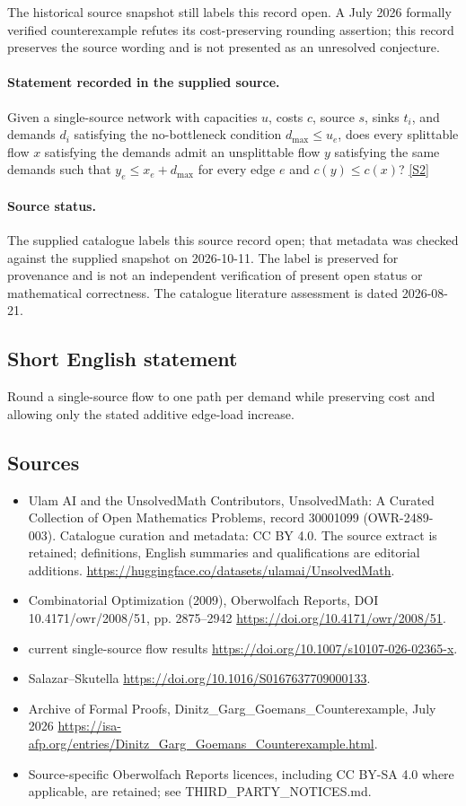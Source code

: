 \documentclass[11pt]{article}
\begin{document}
The historical source snapshot still labels this record open. A July 2026 formally verified counterexample refutes its cost-preserving rounding assertion; this record preserves the source wording and is not presented as an unresolved conjecture.
\paragraph{Statement recorded in the supplied source.}
Given a single-source network with capacities $u$, costs $c$, source $s$, sinks $t_i$, and demands $d_i$ satisfying the no-bottleneck condition $d_{\max}\leq u_e$, does every splittable flow $x$ satisfying the demands admit an unsplittable flow $y$ satisfying the same demands such that $y_e\leq x_e+d_{\max}$ for every edge $e$ and $c(y)\leq c(x)$? \href{https://doi.org/10.4171/owr/2008/51}{[S2]}
\paragraph{Source status.}
The supplied catalogue labels this source record open; that metadata was checked against the supplied snapshot on 2026-10-11. The label is preserved for provenance and is not an independent verification of present open status or mathematical correctness. The catalogue literature assessment is dated 2026-08-21.
\subsection{Short English statement}
Round a single-source flow to one path per demand while preserving cost and allowing only the stated additive edge-load increase.
\subsection{Sources}
\begin{itemize}
\item[S1] Ulam AI and the UnsolvedMath Contributors, UnsolvedMath: A Curated Collection of Open Mathematics Problems, record 30001099 (OWR-2489-003). Catalogue curation and metadata: CC BY 4.0. The source extract is retained; definitions, English summaries and qualifications are editorial additions.
\url{https://huggingface.co/datasets/ulamai/UnsolvedMath}.
\item[S2] Combinatorial Optimization (2009), Oberwolfach Reports, DOI 10.4171/owr/2008/51, pp. 2875--2942
\url{https://doi.org/10.4171/owr/2008/51}.
\item[S3] current single-source flow results
\url{https://doi.org/10.1007/s10107-026-02365-x}.
\item[S4] Salazar--Skutella
\url{https://doi.org/10.1016/S0167637709000133}.
\item[S5] Archive of Formal Proofs, Dinitz\_Garg\_Goemans\_Counterexample, July 2026
\url{https://isa-afp.org/entries/Dinitz_Garg_Goemans_Counterexample.html}.
\item Source-specific Oberwolfach Reports licences, including CC BY-SA 4.0 where applicable, are retained; see THIRD\_PARTY\_NOTICES.md.
\end{itemize}
\end{document}
